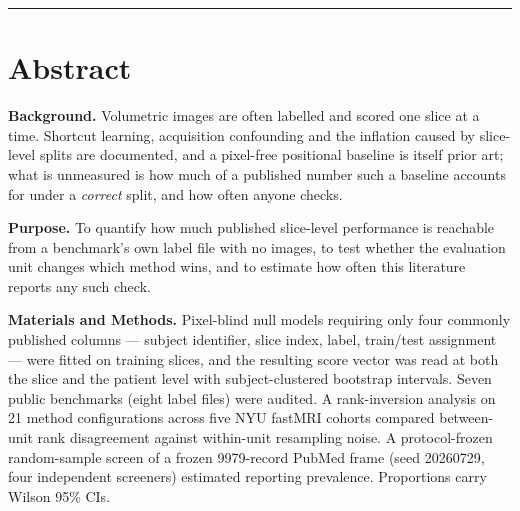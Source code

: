 \documentclass[11pt,a4paper]{article}
\begin{document}
\vspace{1.1em}
\hrule
\vspace{0.9em}

%
\section*{Abstract}

\textbf{Background.} Volumetric images are often labelled and scored one slice at
a time. Shortcut learning, acquisition confounding and the inflation caused by
slice-level splits are documented, and a pixel-free positional baseline is itself
prior art; what is unmeasured is how much of a published number such a baseline
accounts for under a \emph{correct} split, and how often anyone checks.

\textbf{Purpose.} To quantify how much published slice-level performance is
reachable from a benchmark's own label file with no images, to test whether the
evaluation unit changes which method wins, and to estimate how often this
literature reports any such check.

\textbf{Materials and Methods.} Pixel-blind null models requiring only four
commonly published columns --- subject identifier, slice index, label, train/test
assignment --- were fitted on training slices, and the resulting score vector was
read at both the slice and the patient level with subject-clustered bootstrap
intervals. Seven public benchmarks (eight label files) were audited. A
rank-inversion analysis on 21 method configurations across five NYU fastMRI
cohorts compared
between-unit rank disagreement against within-unit resampling noise. A
protocol-frozen random-sample screen of a frozen \num{9979}-record PubMed frame
(seed 20260729, four independent screeners) estimated reporting prevalence.
Proportions carry Wilson 95\% CIs.
\end{document}
